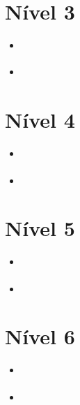 \section{Nível 3}

\begin{itemize}
\item \url{}
\item \url{}
\end{itemize}



\section{Nível 4}

\begin{itemize}
\item \url{}
\item \url{}
\end{itemize}



\section{Nível 5}

\begin{itemize}
\item \url{}
\item \url{}
\end{itemize}



\section{Nível 6}

\begin{itemize}
\item \url{}
\item \url{}
\end{itemize}



